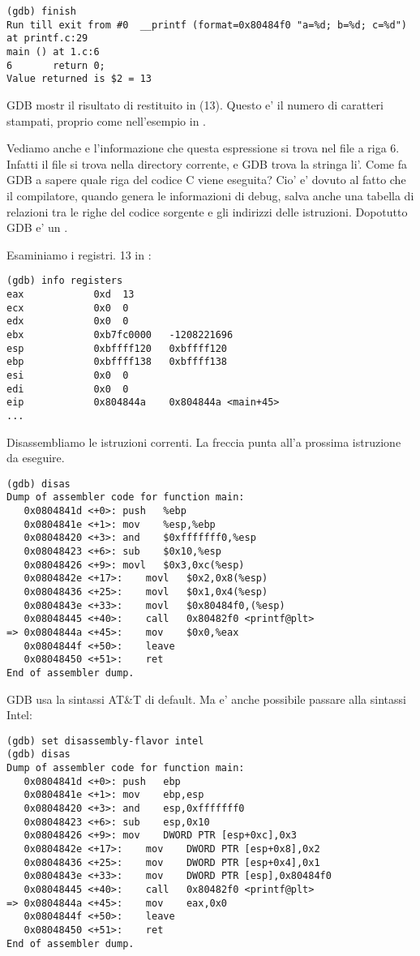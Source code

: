 \begin{lstlisting}
(gdb) finish
Run till exit from #0  __printf (format=0x80484f0 "a=%d; b=%d; c=%d") at printf.c:29
main () at 1.c:6
6		return 0;
Value returned is $2 = 13
\end{lstlisting}

\ac{GDB} mostr il risultato di \printf restituito in \EAX (13).
Questo e' il numero di caratteri stampati, proprio come nell'esempio in \olly.

Vediamo anche  e l'informazione che questa espressione si trova nel file  a riga 6.
Infatti il file  si trova nella directory corrente, e \ac{GDB} trova la stringa li'.
Come fa \ac{GDB} a sapere quale riga del codice C viene eseguita?
Cio' e' dovuto al fatto che il compilatore, quando genera le informazioni di debug, salva anche una tabella di relazioni tra le righe del
codice sorgente e gli indirizzi delle istruzioni.
Dopotutto GDB e' un .

Esaminiamo i registri.
13 in \EAX:

\begin{lstlisting}
(gdb) info registers
eax            0xd	13
ecx            0x0	0
edx            0x0	0
ebx            0xb7fc0000	-1208221696
esp            0xbffff120	0xbffff120
ebp            0xbffff138	0xbffff138
esi            0x0	0
edi            0x0	0
eip            0x804844a	0x804844a <main+45>
...
\end{lstlisting}

Disassembliamo le istruzioni correnti.
La freccia punta all'a prossima istruzione da eseguire.

\begin{lstlisting}
(gdb) disas
Dump of assembler code for function main:
   0x0804841d <+0>:	push   %ebp
   0x0804841e <+1>:	mov    %esp,%ebp
   0x08048420 <+3>:	and    $0xfffffff0,%esp
   0x08048423 <+6>:	sub    $0x10,%esp
   0x08048426 <+9>:	movl   $0x3,0xc(%esp)
   0x0804842e <+17>:	movl   $0x2,0x8(%esp)
   0x08048436 <+25>:	movl   $0x1,0x4(%esp)
   0x0804843e <+33>:	movl   $0x80484f0,(%esp)
   0x08048445 <+40>:	call   0x80482f0 <printf@plt>
=> 0x0804844a <+45>:	mov    $0x0,%eax
   0x0804844f <+50>:	leave  
   0x08048450 <+51>:	ret    
End of assembler dump.
\end{lstlisting}

\ac{GDB} usa la sintassi AT\&T di default.
Ma e' anche possibile passare alla sintassi Intel:

\begin{lstlisting}
(gdb) set disassembly-flavor intel
(gdb) disas
Dump of assembler code for function main:
   0x0804841d <+0>:	push   ebp
   0x0804841e <+1>:	mov    ebp,esp
   0x08048420 <+3>:	and    esp,0xfffffff0
   0x08048423 <+6>:	sub    esp,0x10
   0x08048426 <+9>:	mov    DWORD PTR [esp+0xc],0x3
   0x0804842e <+17>:	mov    DWORD PTR [esp+0x8],0x2
   0x08048436 <+25>:	mov    DWORD PTR [esp+0x4],0x1
   0x0804843e <+33>:	mov    DWORD PTR [esp],0x80484f0
   0x08048445 <+40>:	call   0x80482f0 <printf@plt>
=> 0x0804844a <+45>:	mov    eax,0x0
   0x0804844f <+50>:	leave  
   0x08048450 <+51>:	ret    
End of assembler dump.
\end{lstlisting}

